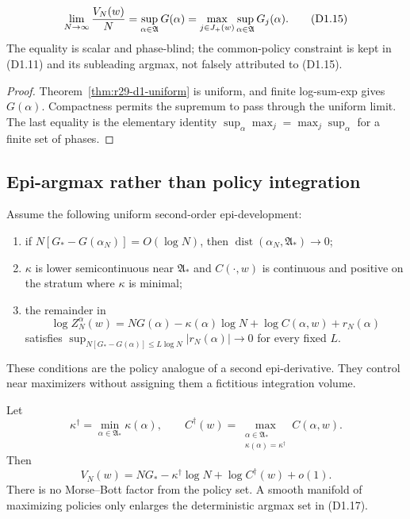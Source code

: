 \begin{proposition}
\label{prop:r29-d1-leading}
\[
 \lim_{N\to\infty}{V_N(w)\over N}
 =\sup_{\alpha\in\mathfrak A}G(\alpha)
 =\max_{j\in J_+(w)}\sup_{\alpha\in\mathfrak A}G_j(\alpha).             \tag{D1.15}
\]
The equality is scalar and phase-blind; the common-policy constraint is kept
in (D1.11) and its subleading argmax, not falsely attributed to (D1.15).
\end{proposition}

\begin{proof}
Theorem~\ref{thm:r29-d1-uniform} is uniform, and finite log-sum-exp gives
$G(\alpha)$.  Compactness permits the supremum to pass through the uniform
limit.  The last equality is the elementary identity
$\sup_\alpha\max_j=\max_j\sup_\alpha$ for a finite set of phases.
\end{proof}

\subsection{Epi-argmax rather than policy integration}

Assume the following uniform second-order epi-development:

\begin{enumerate}[label=(E\arabic*)]
\item if $N[G_*-G(\alpha_N)]=O(\log N)$, then
      $\operatorname{dist}(\alpha_N,\mathfrak A_*)\to0$;
\item $\kappa$ is lower semicontinuous near $\mathfrak A_*$ and
      $C(\cdot,w)$ is continuous and positive on the stratum where
      $\kappa$ is minimal;
\item the remainder in
\[
 \log Z_N^\alpha(w)=NG(\alpha)-\kappa(\alpha)\log N
                    +\log C(\alpha,w)+r_N(\alpha)          \tag{D1.16}
\]
      satisfies $\sup_{N[G_*-G(\alpha)]\le L\log N}|r_N(\alpha)|\to0$
      for every fixed $L$.
\end{enumerate}

These conditions are the policy analogue of a second epi-derivative.  They
control near maximizers without assigning them a fictitious integration
volume.

\begin{theorem}
\label{thm:r29-d1-subleading}
Let
\[
 \kappa^\dagger=
 \min_{\alpha\in\mathfrak A_*}\kappa(\alpha),\qquad
 C^\dagger(w)=
 \max_{\substack{\alpha\in\mathfrak A_*\\
                  \kappa(\alpha)=\kappa^\dagger}}C(\alpha,w).            \tag{D1.17}
\]
Then
\[
 V_N(w)=NG_*-\kappa^\dagger\log N+
        \log C^\dagger(w)+o(1).                          \tag{D1.18}
\]
There is no Morse--Bott factor from the policy set.  A smooth manifold of
maximizing policies only enlarges the deterministic argmax set in (D1.17).
\end{theorem}

